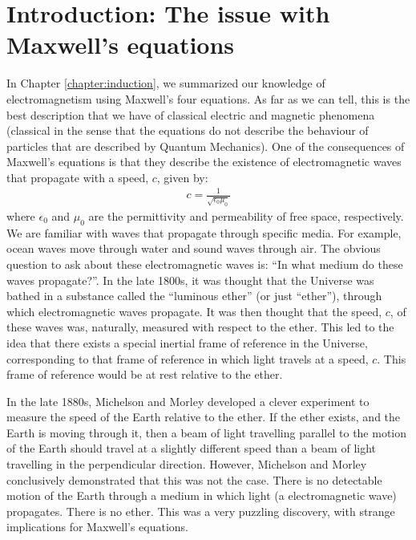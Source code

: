 \section{Introduction: The issue with Maxwell's equations}
In Chapter \ref{chapter:induction}, we summarized our knowledge of electromagnetism using Maxwell's four equations. As far as we can tell, this is the best description that we have of classical electric and magnetic phenomena (classical in the sense that the equations do not describe the behaviour of particles that are described by Quantum Mechanics). One of the consequences of Maxwell's equations is that they describe the existence of electromagnetic waves that propagate with a speed, $c$, given by:
\begin{align*}
c = \frac{1}{\sqrt{\epsilon_0\mu_0}}
\end{align*} 
where $\epsilon_0$ and $\mu_0$ are the permittivity and permeability of free space, respectively. We are familiar with waves that propagate through specific media. For example, ocean waves move through water and sound waves through air. The obvious question to ask about these electromagnetic waves is: ``In what medium do these waves propagate?''. In the late 1800s, it was thought that the Universe was bathed in a substance called the ``luminous ether'' (or just ``ether''), through which electromagnetic waves propagate. It was then thought that the speed, $c$, of these waves was, naturally, measured with respect to the ether. This led to the idea that there exists a special inertial frame of reference in the Universe, corresponding to that frame of reference in which light travels at a speed, $c$. This frame of reference would be at rest relative to the ether.

In the late 1880s, Michelson and Morley developed a clever experiment to measure the speed of the Earth relative to the ether. If the ether exists, and the Earth is moving through it, then a beam of light travelling parallel to the motion of the Earth should travel at a slightly different speed than a beam of light travelling in the perpendicular direction. However, Michelson and Morley conclusively demonstrated that this was not the case. There is no detectable motion of the Earth through a medium in which light (a electromagnetic wave) propagates. There is no ether. This was a very puzzling discovery, with strange implications for Maxwell's equations. 

